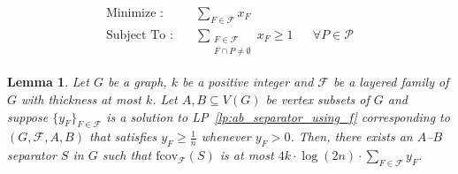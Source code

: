 \documentclass[10pt,a4paper]{amsart}
\newtheorem{lemma}{Lemma}
\newcommand{\f}{\mathcal{F}}
\newcommand{\fcov}{\mathrm{fcov}_{\mathcal{F}}}
\newcommand{\p}{\mathcal{P}}
\begin{document}
\begin{align}\label{lp:ab_separator_using_f}
    \text{Minimize :}&\quad \sum\limits_{F\in \f} x_F\\
    \nonumber \text{Subject To :}&\quad \sum_{\substack{F \in \f \\ F \cap P \neq \emptyset}} x_F \geq 1 && \forall P \in \p
\end{align}

\begin{lemma}\label{lem:ab_separator_with_conditions}
    Let $G$ be a graph, $k$ be a positive integer and $\f$ be a layered family of $G$ with thickness at most $k$. Let $A,B \subseteq V(G)$ be vertex subsets of $G$ and suppose $\{y_F\}_{F \in \f}$ is a solution to LP~\ref{lp:ab_separator_using_f} corresponding to $(G,\f,A,B)$ that satisfies $y_F \ge \frac{1}{n}$ whenever $y_F > 0$. Then, there exists an $A$--$B$ separator $S$ in $G$ such that $\fcov(S)$ is at most $4k \cdot \log(2n) \cdot \sum_{F \in \f} y_F$.
\end{lemma}
\end{document}
